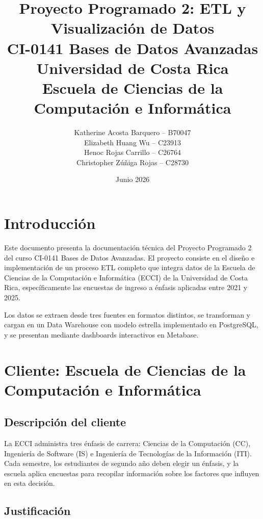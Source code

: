 \documentclass[12pt, letterpaper]{article}
\title{
  \textbf{Proyecto Programado 2: ETL y Visualización de Datos} \\[0.5cm]
  \large CI-0141 Bases de Datos Avanzadas \\
  Universidad de Costa Rica \\
  Escuela de Ciencias de la Computación e Informática
}
\author{
  Katherine Acosta Barquero -- B70047 \\
  Elizabeth Huang Wu -- C23913 \\
  Henoc Rojas Carrillo -- C26764 \\
  Christopher Zúñiga Rojas -- C28730
}
\date{Junio 2026}
\begin{document}
\maketitle
\newpage
\tableofcontents
\newpage

\section{Introducción}

Este documento presenta la documentación técnica del Proyecto Programado 2 del curso CI-0141 Bases de Datos Avanzadas. El proyecto consiste en el diseño e implementación de un proceso ETL completo que integra datos de la Escuela de Ciencias de la Computación e Informática (ECCI) de la Universidad de Costa Rica, específicamente las encuestas de ingreso a énfasis aplicadas entre 2021 y 2025.

Los datos se extraen desde tres fuentes en formatos distintos, se transforman y cargan en un Data Warehouse con modelo estrella implementado en PostgreSQL, y se presentan mediante dashboards interactivos en Metabase.

\section{Cliente: Escuela de Ciencias de la Computación e Informática}

\subsection{Descripción del cliente}

La ECCI administra tres énfasis de carrera: Ciencias de la Computación (CC), Ingeniería de Software (IS) e Ingeniería de Tecnologías de la Información (ITI). Cada semestre, los estudiantes de segundo año deben elegir un énfasis, y la escuela aplica encuestas para recopilar información sobre los factores que influyen en esta decisión.

\subsection{Justificación}
\end{document}
